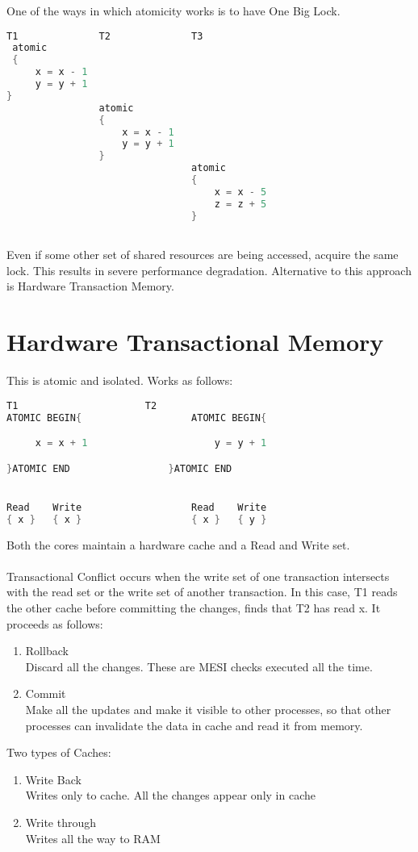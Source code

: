 \documentclass[twoside]{article}
\begin{document}
One of the ways in which atomicity works is to have One Big Lock.
\begin{lstlisting}[language=C]
T1				T2				T3
 atomic
 {
     x = x - 1
     y = y + 1
}
				atomic
				{
				    x = x - 1
				    y = y + 1
				}
								atomic
								{		 	
								    x = x - 5
								    z = z + 5	
								}



\end{lstlisting}
Even if some other set of shared resources are being accessed, acquire the same lock. This results in severe performance degradation. Alternative to this approach is Hardware Transaction Memory.

\section{Hardware Transactional Memory}
This is atomic and isolated. Works as follows:
\begin{lstlisting}[language=C]
	T1						T2
ATOMIC BEGIN{					ATOMIC BEGIN{

     x = x + 1						y = y + 1

}ATOMIC END					}ATOMIC END


Read	Write					Read    Write  
{ x }	{ x }					{ x }	{ y }


\end{lstlisting}

 Both the cores maintain a hardware cache and a Read and Write set.\\
\\
 Transactional Conflict occurs when the write set of one transaction intersects with the read set or the write set of another  transaction. In this case, T1 reads the other cache before committing the changes, finds that T2 has read x. It proceeds as follows:
\begin{enumerate}
  \item Rollback\\
  Discard all the changes. These are MESI checks executed all the time.
 
  \item Commit\\
Make all the updates and make it visible to other processes, so that other processes can invalidate the data in cache and read it from memory.

\end{enumerate}

Two  types of Caches: 
\begin{enumerate}
  \item Write Back\\
  Writes only to cache. All the changes appear only in cache
  \item Write through\\
Writes all the way to RAM
\end{enumerate}
\end{document}
